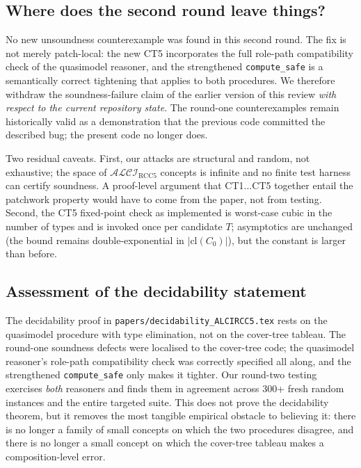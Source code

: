 \documentclass[]{ceurart}
\newcommand{\ALCI}{\mathcal{ALCI}}
\newcommand{\ALCIRCC}[1]{\ALCI_{\mathrm{RCC}#1}}
\newcommand{\Cl}{\mathrm{cl}}
\theoremstyle{definition}
\theoremstyle{remark}
\begin{document}
\subsection{Where does the second round leave things?}

No new unsoundness counterexample was found in this second round. The
fix is not merely patch-local: the new CT5 incorporates the full
role-path compatibility check of the quasimodel reasoner, and the
strengthened \texttt{compute\_safe} is a semantically correct
tightening that applies to both procedures. We therefore withdraw
the soundness-failure claim of the earlier version of this review
\emph{with respect to the current repository state}. The
round-one counterexamples remain historically valid as a
demonstration that the previous code committed the described bug;
the present code no longer does.

Two residual caveats. First, our attacks are structural and random,
not exhaustive; the space of $\ALCIRCC{5}$ concepts is infinite and
no finite test harness can certify soundness. A proof-level argument
that CT1$\ldots$CT5 together entail the patchwork property would
have to come from the paper, not from testing. Second, the
CT5 fixed-point check as implemented is worst-case cubic in the
number of types and is invoked once per candidate $T$; asymptotics
are unchanged (the bound remains double-exponential in
$|\Cl(C_0)|$), but the constant is larger than before.

\subsection{Assessment of the decidability statement}

The decidability proof in \verb|papers/decidability_ALCIRCC5.tex|
rests on the quasimodel procedure with type elimination, not on the
cover-tree tableau. The round-one soundness defects were localised
to the cover-tree code; the quasimodel reasoner's role-path
compatibility check was correctly specified all along, and the
strengthened \texttt{compute\_safe} only makes it tighter. Our
round-two testing exercises \emph{both} reasoners and finds them in
agreement across 300+ fresh random instances and the entire targeted
suite. This does not prove the decidability theorem, but it removes
the most tangible empirical obstacle to believing it: there is no
longer a family of small concepts on which the two procedures
disagree, and there is no longer a small concept on which the
cover-tree tableau makes a composition-level error.
\end{document}
